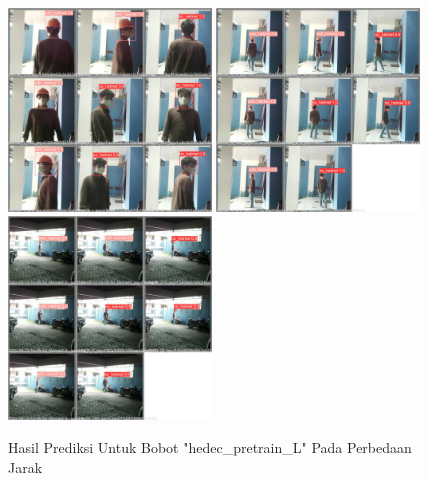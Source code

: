 \begin{enumerate}
  \begin{figure} [h!]
    \centering
    \includegraphics[width=0.48\textwidth]{gambar/BerdasarkanJarak_v2/val_hedec_pretrain_L/Jarak1_3/val_batch0_pred.jpg}
    \includegraphics[width=0.48\textwidth]{gambar/BerdasarkanJarak_v2/val_hedec_pretrain_L/Jarak5_3/val_batch0_pred.jpg}
    \includegraphics[width=0.48\textwidth]{gambar/BerdasarkanJarak_v2/val_hedec_pretrain_L/Jarak9/val_batch0_pred.jpg}
    \caption{Hasil Prediksi Untuk Bobot "hedec\_pretrain\_L" Pada Perbedaan Jarak}
    \label{fig:valjarak_sample_hedec_pretrain_L}  
  \end{figure}

\end{enumerate}


